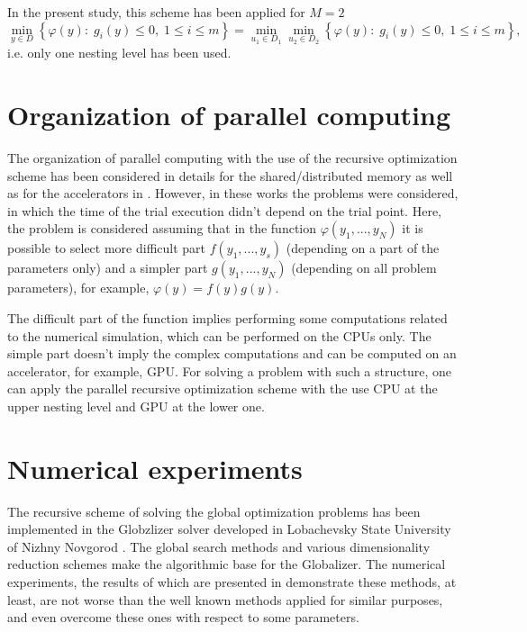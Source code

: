 \documentclass[a4paper]{jpconf}
\begin{document}
In the present study, this scheme has been applied for $M=2$
\[
\min_{y \in D}{\left\{\varphi(y): \; g_i(y)\leq 0, \; 1 \leq i \leq 
m\right\}}= \min_{u_1\in D_1}\min_{u_2\in D_2}{\left\{\varphi(y): \; 
g_i(y)\leq 0, \; 1 \leq i \leq m\right\}},
\]
i.e. only one nesting level has been used.

\section{Organization of parallel computing}\label{sec:4}

The organization of parallel computing with the use of the recursive 
optimization scheme has been considered in details for the shared/distributed 
memory as well as for the accelerators in \cite{Sysoyev,BarkalovLebedev}. However, in these works the 
problems were considered, in which the time of the trial execution didn't 
depend on the trial point. Here, the problem is considered assuming that in 
the function $\varphi(y_1,...,y_N)$ it is possible to select more difficult 
part $f(y_1,...,y_s)$ (depending on a part of the parameters only) and a simpler 
part $g(y_1,...,y_N)$ (depending on all problem parameters), for 
example, $\varphi(y)= f(y)g(y)$.

The difficult part of the function implies performing some  
computations related to the numerical simulation, which can be performed on the 
CPUs only. The simple part doesn't imply the complex computations and can be 
computed on an accelerator, for example, GPU. For solving a problem with such 
a structure, one can apply the parallel recursive optimization scheme with 
the use CPU at the upper nesting level and GPU at the lower one.

\section{Numerical experiments}\label{sec:5}

The recursive scheme of solving the global optimization problems has been 
implemented in the Globzlizer solver developed in Lobachevsky State 
University of Nizhny Novgorod \cite{Globalizer,Globalizer1}. The global search methods and various 
dimensionality reduction schemes make the algorithmic base for the 
Globalizer. The numerical experiments, the results of which are presented in 
\cite{BarkalovGergelLebedev,BarkalovGergel} demonstrate these methods, at least, are not worse than the well known 
methods applied for similar purposes, and even overcome these ones with 
respect to some parameters. 
\end{document}
